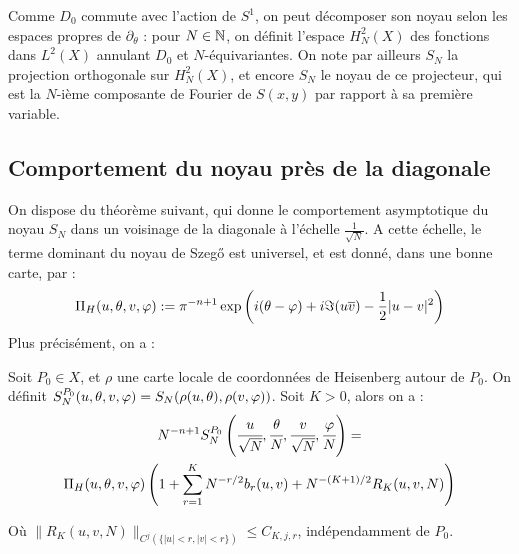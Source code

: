 Comme $D_0$ commute avec l'action de $S^1$, on peut décomposer son noyau selon les espaces propres de $\partial_{\theta}$ : pour $N \in \mathbb{N}$, on définit l'espace $H^2_N(X)$ des fonctions dans $L^2(X)$ annulant $D_0$ et $N$-équivariantes. On note par ailleurs  $S_N$ la projection orthogonale sur $H^2_N(X)$, et encore $S_N$ le noyau de ce projecteur, qui est la $N$-ième composante de Fourier de $S(x,y)$ par rapport à sa première variable.

\subsection{Comportement du noyau près de la diagonale}
On dispose du théorème suivant, qui donne le comportement asymptotique du noyau $S_N$ dans un voisinage de la diagonale à l'échelle $\frac{1}{\sqrt{N}}$. A cette échelle, le terme dominant du noyau de Szeg\H{o} est universel, et est donné, dans une bonne carte, par :
\begin{equation*}
	\Pi_H(u,\theta,v,\varphi) := \pi^{-n+1}\exp\left(i(\theta-\varphi)+i\Im(u\overline{v}) - \frac12 |u-v|^2\right)
\end{equation*}
Plus précisément, on a :
\begin{theorem}
	Soit $P_0 \in X$, et $\rho$ une carte locale de coordonnées de Heisenberg autour de $P_0$. On définit $S_N^{P_0}(u,\theta,v,\varphi) = S_N(\rho(u,\theta), \rho(v,\varphi))$. Soit $K>0$, alors on a :
	\begin{multline*}
	N^{-n+1}S_N^{P_0}\left(\cfrac{u}{\sqrt{N}},\cfrac{\theta}{N}, \cfrac{v}{\sqrt{N}}, \cfrac{\varphi}{N}\right) = \\\Pi_H(u,\theta,v,\varphi)\left(1+\sum_{r=1}^K N^{-r/2}b_r(u,v) + N^{-(K+1)/2}R_K(u,v,N)\right)
	\end{multline*}
	
	Où $\|R_K(u,v,N)\|_{C^j(\{|u| < r, |v| < r\})} \leq C_{K,j,r}$, indépendamment de $P_0$.
\end{theorem}

